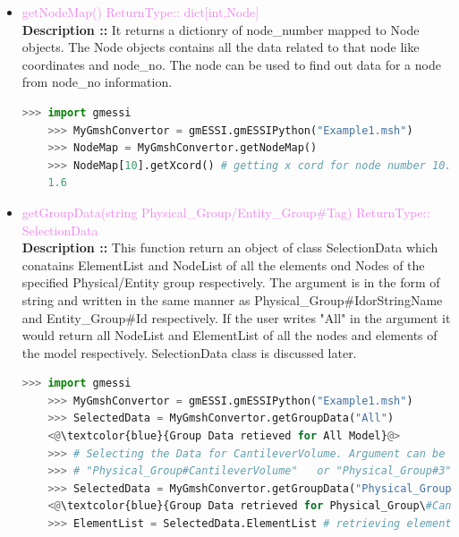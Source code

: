 \documentclass[11pt]{article}
\begin{document}
\begin{itemize}
    \item \textcolor{violet}{ getNodeMap() \hfill {ReturnType:: dict[int,Node]}} \\
    \textbf{Description ::} It returns a dictionry of node\_number mapped to Node objects. The Node objects contains all the data related to that node like coordinates and node\_no. The node can be used to find out data for a node from node\_no information.
    \begin{lstlisting}[language=Python]
    >>> import gmessi
    >>> MyGmshConvertor = gmESSI.gmESSIPython("Example1.msh")
    >>> NodeMap = MyGmshConvertor.getNodeMap()
    >>> NodeMap[10].getXcord() # getting x cord for node number 10.
    1.6
    \end{lstlisting}

    \item \textcolor{violet}{ getGroupData(string Physical\_Group/Entity\_Group\#Tag) \hfill {ReturnType:: SelectionData}} \\
    \textbf{Description ::} This function return an object of class SelectionData which conatains ElementList and NodeList of all the elements ond Nodes of the specified Physical/Entity group respectively.
    The argument is in the form of string and written in the same manner as Physical\_Group\#IdorStringName and Entity\_Group\#Id respectively. If the user writes "All" in the argument it would return all NodeList and ElementList of all the nodes and elements of the model respectively. SelectionData class is discussed later.
    \begin{lstlisting}[language=Python]
    >>> import gmessi
    >>> MyGmshConvertor = gmESSI.gmESSIPython("Example1.msh")
    >>> SelectedData = MyGmshConvertor.getGroupData("All")
    <@\textcolor{blue}{Group Data retieved for All Model}@>
    >>> # Selecting the Data for CantileverVolume. Argument can be 
    >>> # "Physical_Group#CantileverVolume"   or "Physical_Group#3"
    >>> SelectedData = MyGmshConvertor.getGroupData("Physical_Group#CantileverVolume")
    <@\textcolor{blue}{Group Data retrieved for Physical_Group\#CantileverVolume}@>
    >>> ElementList = SelectedData.ElementList # retrieving elementlist from the SelectionData Class
    \end{lstlisting}


\end{itemize}
\end{document}
